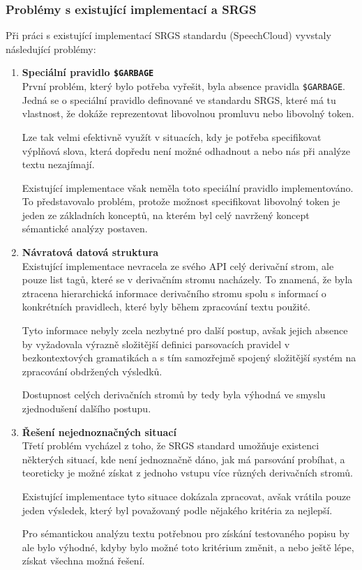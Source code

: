 \subsubsection{Problémy s existující implementací a SRGS}
Při práci s existující implementací SRGS standardu (SpeechCloud)
vyvstaly následující problémy:
\begin{enumerate}
	\item \textbf{Speciální pravidlo \texttt{\$GARBAGE}}\\
	      První problém, který bylo potřeba vyřešit, byla absence pravidla \texttt{\$GARBAGE}.
	      Jedná se o speciální pravidlo definované ve standardu SRGS, které má tu vlastnost, že dokáže reprezentovat libovolnou promluvu nebo libovolný token.

	      Lze tak velmi efektivně využít v situacích, kdy je potřeba specifikovat výplňová slova,
	      která dopředu není možné odhadnout a nebo nás při analýze textu nezajímají.

	      Existující implementace však neměla toto speciální pravidlo implementováno.
	      To představovalo problém, protože možnost specifikovat libovolný token je jeden ze základních konceptů,
	      na kterém byl celý navržený koncept sémantické analýzy postaven.
	\item \textbf{Návratová datová struktura}\\
	      Existující implementace nevracela ze svého API celý derivační strom, ale pouze list tagů, které se v derivačním stromu nacházely.
	      To znamená, že byla ztracena hierarchická informace derivačního stromu spolu s informací o konkrétních pravidlech,
	      které byly během zpracování textu použité.

	      Tyto informace nebyly zcela nezbytné pro další postup, avšak jejich absence by
	      vyžadovala výrazně složitější definici parsovacích pravidel v bezkontextových gramatikách a
	      s tím samozřejmě spojený složitější systém na zpracování obdržených výsledků.

	      Dostupnost celých derivačních stromů by tedy byla výhodná ve smyslu zjednodušení dalšího postupu.
	\item \textbf{Řešení nejednoznačných situací}\\
	      Třetí problém vycházel z toho, že SRGS standard umožňuje existenci některých situací,
	      kde není jednoznačně dáno, jak má parsování probíhat,
	      a teoreticky je možné získat z jednoho vstupu více různých derivačních stromů.

	      Existující implementace tyto situace dokázala zpracovat, avšak vrátila pouze jeden výsledek,
	      který byl považovaný podle nějakého kritéria za nejlepší.

	      Pro sémantickou analýzu textu potřebnou pro získání testovaného popisu by ale bylo výhodné,
	      kdyby bylo možné toto kritérium změnit, a nebo ještě lépe, získat všechna možná řešení.
\end{enumerate}

